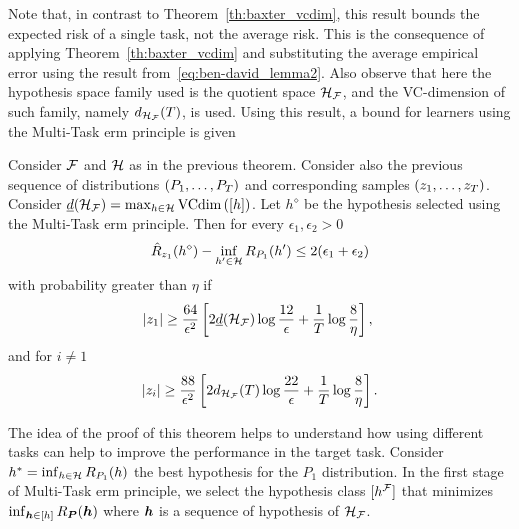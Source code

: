 Note that, in contrast to Theorem~\ref{th:baxter_vcdim}, this result bounds the expected risk of a single task, not the average risk. This is the consequence of applying Theorem~\ref{th:baxter_vcdim} and substituting the average empirical error using the result from~\eqref{eq:ben-david_lemma2}.
Also observe that here the hypothesis space family used is the quotient space $\mathcal{H}_{\mathcal{F}}$, and the VC-dimension of such family, namely $d_{\mathcal{H}_{\mathcal{F}}}(T)$, is used.
%
Using this result, a bound for learners using the Multi-Task \acrshort{erm} principle is given~\cite[Theorem~3]{Ben-DavidB08}
\begin{theorem}\label{th:ben-david_th3}
    Consider $\mathcal{F}$ and $\mathcal{H}$ as in the previous theorem. Consider also the previous sequence of distributions $(P_1, \ldots, P_T)$ and corresponding samples $(z_1, \ldots, z_T)$. Consider $\underline{d}(\mathcal{H}_{\mathcal{F}}) = \max_{h \in \mathcal{H}} \text{VCdim}\left(\lbrack h\rbrack\right)$.
    Let $h^\diamond$ be the hypothesis selected using the Multi-Task \acrshort{erm} principle. Then for every $\epsilon_1, \epsilon_2 > 0$
    \begin{equation}
        \nonumber
        {\hat{R}_{z_1}(h^\diamond) - \inf_{h' \in \mathcal{H}}R_{P_1}(h')}  \leq 2(\epsilon_1 + \epsilon_2)
    \end{equation}
    with probability greater than $\eta$ if
    \begin{equation}
        \label{eq:ben-david_th3_ineq1}
        \cardinal{\sample_1} \geq  \frac{64}{\epsilon^2} \left[2 \underline{d}(\hypspace_\frelset) \log \frac{12}{\epsilon} + \frac{1}{\ntasks}\log\frac{8}{\eta} \right], \; 
    \end{equation}
    and for $i \neq 1$
    \begin{equation}
        \label{eq:ben-david_th3_ineq2}
        \cardinal{\sample_i} \geq  \frac{88}{\epsilon^2} \left[2 d_{\hypspace_\frelset}(\ntasks) \log \frac{22}{\epsilon} + \frac{1}{\ntasks}\log\frac{8}{\eta} \right] .
    \end{equation}
\end{theorem}
The idea of the proof of this theorem helps to understand how using different tasks can help to improve the performance in the target task. 
Consider $h^* = \inf_{h \in \mathcal{H}} R_{P_1}(h)$ the best hypothesis for the $P_1$ distribution.
%
In the first stage of Multi-Task \acrshort{erm} principle, we select the hypothesis class $\lbrack h^{\mathcal{F}}\rbrack$ that minimizes $\inf_{\bm{h} \in \lbrack h\rbrack} R_{\bm{P}}(\bm{h})$ where $\bm{h}$ is a sequence of hypothesis of $\mathcal{H}_{\mathcal{F}}$.
